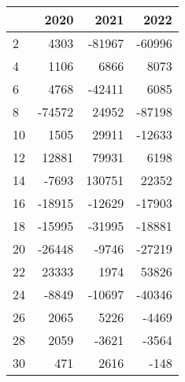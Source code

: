 \begin{tabular}{lrrr}
\toprule
{} &   2020 &    2021 &   2022 \\
\midrule
2  &   4303 &  -81967 & -60996 \\
4  &   1106 &    6866 &   8073 \\
6  &   4768 &  -42411 &   6085 \\
8  & -74572 &   24952 & -87198 \\
10 &   1505 &   29911 & -12633 \\
12 &  12881 &   79931 &   6198 \\
14 &  -7693 &  130751 &  22352 \\
16 & -18915 &  -12629 & -17903 \\
18 & -15995 &  -31995 & -18881 \\
20 & -26448 &   -9746 & -27219 \\
22 &  23333 &    1974 &  53826 \\
24 &  -8849 &  -10697 & -40346 \\
26 &   2065 &    5226 &  -4469 \\
28 &   2059 &   -3621 &  -3564 \\
30 &    471 &    2616 &   -148 \\
\bottomrule
\end{tabular}
